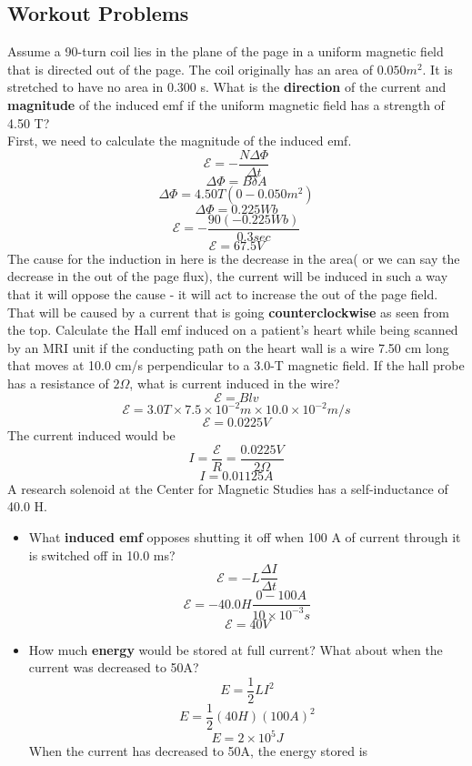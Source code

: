 \documentclass[12pt,addpoints]{exam}
\begin{document}
{{{\begin{questions}
					\subsection*{Workout Problems}
					\question Assume a 90-turn coil lies in the plane of the page in a uniform magnetic field that is directed out of the page. The coil originally has an area of  $0.050m^2$. It is stretched to have no area in 0.300 s. What is the \textbf{direction} of the current and \textbf{magnitude} of the induced emf if the uniform magnetic field has a strength of 4.50 T? \\ 
					First, we need to calculate the magnitude of the induced emf.
					$$\mathcal{E}=-\dfrac{N\Delta\Phi}{\Delta t}$$
					$$\Delta\Phi=B\delta A$$
					$$\Delta\Phi=4.50T(0-0.050m^2)$$
					$$\Delta\Phi=0.225Wb$$
					$$\mathcal{E}=-\dfrac{90(-0.225Wb)}{0.3sec}$$
					$$\mathcal{E}=67.5V$$
					The cause for the induction in here is the decrease in the area( or we can say the decrease in the out of the page flux), the current will be induced in such a way that it will oppose the cause - it will act to increase the out of the page field. That will be caused by a current that is going \textbf{counterclockwise} as seen from the top.
					\question Calculate the Hall emf induced on a patient’s heart while being scanned by an MRI unit if the conducting path on the heart wall is a wire 7.50 cm long that moves at 10.0 cm/s perpendicular to a 3.0-T magnetic field. If the hall probe has a resistance of $2\Omega$, what is current induced in the wire? \\
					$$\mathcal{E}=Blv$$
					$$\mathcal{E}=3.0T\times7.5\times10^{-2}m\times10.0\times10^{-2}m/s$$
					$$\mathcal{E}=0.0225V$$
					The current induced would be
					$$I=\dfrac{\mathcal{E}}{R}=\dfrac{0.0225V}{2\Omega}$$
					$$I=0.01125A$$
					\question A research solenoid at the Center for Magnetic Studies has a self-inductance of 40.0 H. 
					\begin{itemize}
						\item What \textbf{induced emf} opposes shutting it off when 100 A of current through it is switched off in 10.0 ms?
						$$\mathcal{E}=-L\dfrac{\Delta I}{\Delta t}$$
						$$\mathcal{E}=-40.0H\dfrac{0-100A}{10\times10^{-3}s}$$
						$$\mathcal{E}=40V$$
						\item How much \textbf{energy} would be stored at full current? What about when the current was decreased to 50A?
						$$E=\dfrac{1}{2}LI^2$$
						$$E=\dfrac{1}{2}(40H)(100A)^2$$
						$$E=2\times10^5J$$
						When the current has decreased to 50A, the energy stored is

\end{itemize}
\end{questions}}}}
\end{document}
